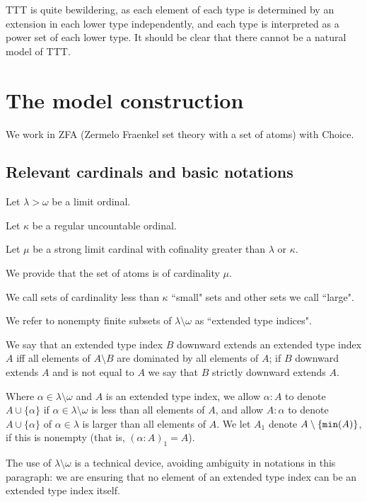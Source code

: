 \documentclass[12pt]{article}
\begin{document}
TTT is quite bewildering, as each element of each type is determined by an extension in each lower type independently, and each type is interpreted as a power set of each lower type.  It should be clear that there cannot be a natural model of TTT.



\newpage

\section{The model construction}

We work in ZFA (Zermelo Fraenkel set theory with a set of atoms) with Choice.

\subsection{Relevant cardinals and basic notations}

Let $\lambda>\omega$ be a limit ordinal.

Let $\kappa$ be a regular uncountable ordinal.

Let $\mu$ be a strong limit cardinal with cofinality greater than $\lambda$ or $\kappa$.

We provide that the set of atoms is of cardinality $\mu$.

We call sets of cardinality less than $\kappa$ ``small" sets and other sets we call ``large".

We refer to nonempty finite subsets of $\lambda\setminus \omega$ as ``extended type indices".

We say that an extended type index $B$ downward extends an extended type index $A$ iff all elements of $A \setminus B$ are dominated by all elements of $A$;  if
$B$ downward extends $A$ and is not equal to $A$ we say that $B$ strictly downward extends $A$.

Where $\alpha \in \lambda\setminus \omega$ and $A$ is an extended type index, we allow $\alpha:A$ to denote $A \cup \{\alpha\}$ if $\alpha\in \lambda \setminus \omega$ is less than all elements of $A$,
and allow $A:\alpha$ to denote $A \cup \{\alpha\}$ of $\alpha\in \lambda$ is larger than all elements of $A$.   We let $A_1$ denote $A \setminus \{{\tt min}(A)\}$, if this is nonempty (that is,
$(\alpha:A)_1 = A$).  

The use of $\lambda \setminus \omega$ is a technical device, avoiding ambiguity in notations in this paragraph:  we are ensuring that no element of an extended type index can be an extended type index itself.
\end{document}

